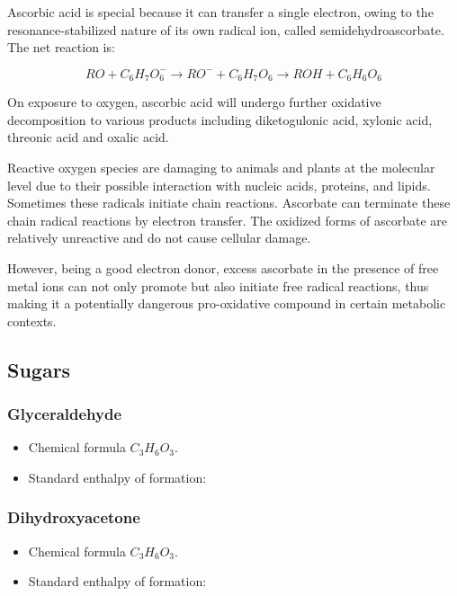 \documentclass{article}
\begin{document}
Ascorbic acid is special because it can transfer a single electron, owing to the
resonance-stabilized nature of its own radical ion, called semidehydroascorbate. The net
reaction is:

\[
    RO + C_6H_7O_6^- \rightarrow RO^− + C_6H_7O_6 \rightarrow ROH + C_6H_6O_6
\]

On exposure to oxygen, ascorbic acid will undergo further oxidative decomposition to
various products including diketogulonic acid, xylonic acid, threonic acid and oxalic
acid.

Reactive oxygen species are damaging to animals and plants at the molecular level due to
their possible interaction with nucleic acids, proteins, and lipids. Sometimes these
radicals initiate chain reactions. Ascorbate can terminate these chain radical reactions
by electron transfer. The oxidized forms of ascorbate are relatively unreactive and do not
cause cellular damage.

However, being a good electron donor, excess ascorbate in the presence of free metal ions
can not only promote but also initiate free radical reactions, thus making it a
potentially dangerous pro-oxidative compound in certain metabolic contexts.

\subsection{Sugars}

\subsubsection{Glyceraldehyde}
\begin{itemize}
    \item Chemical formula $C_3H_6O_3$.
    \item Standard enthalpy of formation:
\end{itemize}

\subsubsection{Dihydroxyacetone}
\begin{itemize}
    \item Chemical formula $C_3H_6O_3$.
    \item Standard enthalpy of formation:
\end{itemize}
\end{document}
